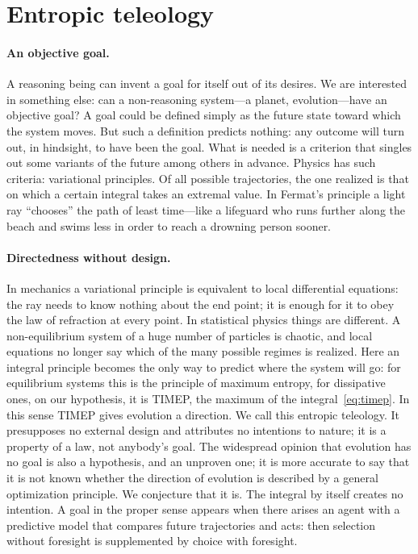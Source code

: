 \documentclass[11pt,a4paper]{article}
\begin{document}
\section{Entropic teleology}\label{sec:teleology}

\paragraph{An objective goal.}
A reasoning being can invent a goal for itself out of its desires. We are interested in something else: can a non-reasoning system---a planet, evolution---have an objective goal? A goal could be defined simply as the future state toward which the system moves. But such a definition predicts nothing: any outcome will turn out, in hindsight, to have been the goal. What is needed is a criterion that singles out some variants of the future among others in advance. Physics has such criteria: variational principles. Of all possible trajectories, the one realized is that on which a certain integral takes an extremal value. In Fermat's principle a light ray ``chooses'' the path of least time---like a lifeguard who runs further along the beach and swims less in order to reach a drowning person sooner.

\paragraph{Directedness without design.}
In mechanics a variational principle is equivalent to local differential equations: the ray needs to know nothing about the end point; it is enough for it to obey the law of refraction at every point. In statistical physics things are different. A non-equilibrium system of a huge number of particles is chaotic, and local equations no longer say which of the many possible regimes is realized. Here an integral principle becomes the only way to predict where the system will go: for equilibrium systems this is the principle of maximum entropy, for dissipative ones, on our hypothesis, it is TIMEP, the maximum of the integral~\eqref{eq:timep}. In this sense TIMEP gives evolution a direction. We call this entropic teleology. It presupposes no external design and attributes no intentions to nature; it is a property of a law, not anybody's goal. The widespread opinion that evolution has no goal is also a hypothesis, and an unproven one; it is more accurate to say that it is not known whether the direction of evolution is described by a general optimization principle. We conjecture that it is. The integral by itself creates no intention. A goal in the proper sense appears when there arises an agent with a predictive model that compares future trajectories and acts: then selection without foresight is supplemented by choice with foresight.
\end{document}
